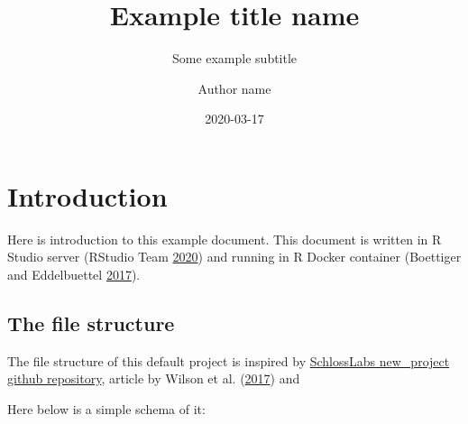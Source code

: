\documentclass[
]{article}
\title{Example title name}
\subtitle{Some example subtitle}
\author{Author name}
\date{2020-03-17}
\begin{document}
\maketitle

{
\hypersetup{linkcolor=NavyBlue}
\setcounter{tocdepth}{2}
\tableofcontents
}
\clearpage

\hypertarget{introduction}{%
\section{Introduction}\label{introduction}}

Here is introduction to this example document. This document is written in R Studio server (RStudio Team \protect\hyperlink{ref-RStudioTeam2020}{2020}) and running in R Docker container (Boettiger and Eddelbuettel \protect\hyperlink{ref-Boettiger2017}{2017}).

\hypertarget{the-file-structure}{%
\subsection{The file structure}\label{the-file-structure}}

The file structure of this default project is inspired by \href{https://github.com/SchlossLab/new_project}{SchlossLabs new\_project github repository}, article by Wilson et al. (\protect\hyperlink{ref-Wilson2017}{2017}) and

Here below is a simple schema of it:
\end{document}
